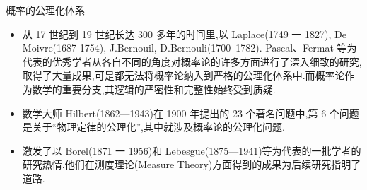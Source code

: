 \begin{frame}{概率的公理化体系}

\begin{itemize}[<+-|alert@+>]
    \item  从 17 世纪到 19 世纪长达 300 多年的时间里,以 Laplace(1749 一
1827), De Moivre(1687-1754), J.Bernouil, D.Bernouli(1700--1782).
Pascal、Fermat 等为代表的优秀学者从各自不同的角度对概率论的许多方面进行了深入细致的研究,取得了大量成果,可是都无法将概率论纳入到严格的公理化体系中.而概率论作为数学的重要分支,其逻辑的严密性和完整性始终受到质疑.
\item 数学大师 Hilbert(1862—1943)在 1900 年提出的 23 个著名问题中,第 6 个问题是关于“物理定律的公理化”,其中就涉及概率论的公理化问题.
\item 激发了以 Borel(1871 一 1956)和 Lebesgue(1875—1941)等为代表的一批学者的研究热情.他们在测度理论(Measure Theory)方面得到的成果为后续研究指明了道路.
\end{itemize}
\end{frame}





